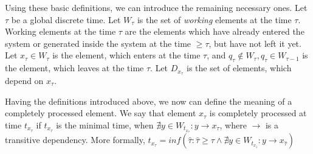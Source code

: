 \documentclass[sigconf]{acmart}
\theoremstyle{remark}
\begin{document}
Using these basic definitions, we can introduce the remaining necessary ones. Let $\tau$ be a global discrete time. Let $W_\tau$ is the set of {\em working} elements at the time $\tau$. Working elements at the time $\tau$ are the elements which have already entered the system or generated inside the system at the time $\geqslant{\tau}$, but have not left it yet. Let $x_\tau\in{W_\tau}$ is the element, which enters at the time $\tau$, and $q_\tau\notin{W_\tau},q_\tau\in{W_{\tau-1}}$ is the element, which leaves at the time $\tau$. Let $D_{x_{\tau}}$ is the set of elements, which depend on $x_\tau$.

Having the definitions introduced above, we now can define the meaning of a completely processed element. We say that element $x_\tau$ is completely processed at time $t_{x_{\tau}}$ if $t_{x_{\tau}}$ is the minimal time, when $\nexists{y\in{W_{t_{x_{\tau}}}}}:{y}\to{x_{\tau}}$, where $\to$ is a transitive dependency. More formally, $t_{x_{\tau}} = inf(\hat{\tau}:\hat{\tau}\geqslant{\tau}\land{\nexists{y\in{W_{t_{x_{\hat{\tau}}}}}}:{y}\to{x_{\hat{\tau}}}})$




\end{document}
